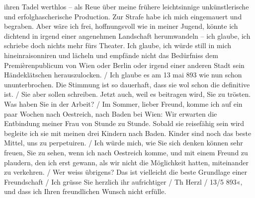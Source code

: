 {{{                        ihren Tadel werthlos – als Reue über meine frühere leichtsinnige
                        unkünstlerische und erfolghascherische Production. Zur Strafe habe ich mich
                        eingemauert und begraben. Aber wäre ich frei, hoffnungsvoll wie in meiner
                        Jugend, könnte ich dichtend in irgend einer angenehmen Landschaft
                        herumwandeln – ich glaube, ich schriebe doch nichts mehr fürs Theater. Ich
                        glaube, ich würde still in mich hineinraisonniren und lächeln und empfände
                        nicht das Bedürfniss dem Premièrenpublicum von Wien oder Berlin oder irgend
                        einer anderen Stadt sein Händeklätschen herauszulocken.{ / }Ich glaube es am 13 mai 893 wie nun schon
                        ununterbrochen. Die
                        Stimmung ist so dauerhaft, dass sie wol schon die definitive ist.{ / }Sie aber sollen schreiben. Jetzt auch, weil es beitragen wird, Sie zu
                        trösten. Was haben Sie in der Arbeit?{ / }Im Sommer, lieber Freund, komme ich auf ein paar Wochen nach Oestreich, nach Baden bei Wien: Wir
                        erwarten die Entbindung meiner Frau von Stunde zu Stunde. Sobald sie reisefähig
                        sein wird begleite ich sie mit meinen drei Kindern nach
                           Baden. Kinder sind noch das beste
                        Mittel, uns zu perpetuiren.{ / }Ich würde mich, wie Sie sich denken können sehr freuen, Sie zu sehen, wenn
                        ich nach Oestreich komme, und mit einem
                        Freund zu plaudern, den ich erst gewann, als wir nicht die Möglichkeit
                        hatten, miteinander zu verkehren.{ / }Wer weiss übrigens? Das ist vielleicht die beste Grundlage einer
                        Freundschaft{ / }Ich grüsse Sie herzlich ihr aufrichtiger{ / }Th Herzl{ / }13/5 893«}}}\label{K_L03829-1}, und dass ich Ihren freundlichen Wunsch nicht erfülle.\pend
           
